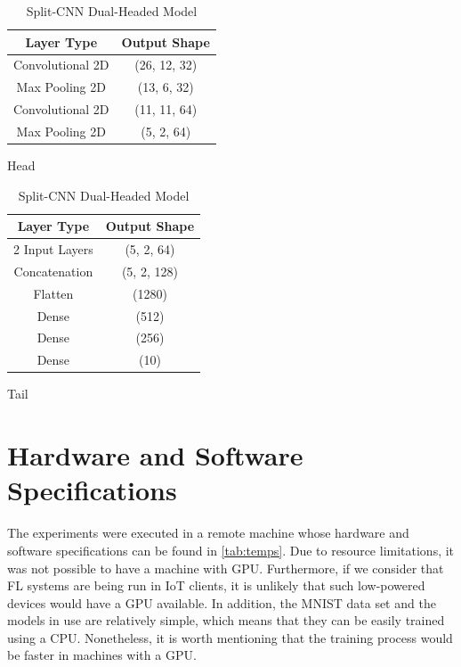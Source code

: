 \begin{table}[!h]
    \begin{subtable}[h]{0.49\textwidth}
        \centering
        \begin{tabular}{c|c}
            \hline \hline
            Layer Type       & Output Shape \\ \hline \hline
            Convolutional 2D & (26, 12, 32) \\ \hline
            Max Pooling 2D   & (13, 6, 32) \\ \hline
            Convolutional 2D & (11, 11, 64) \\ \hline
            Max Pooling 2D   & (5, 2, 64)   \\ \hline
        \end{tabular}
        \caption{Head}
    \end{subtable}
    \hfill
    \begin{subtable}[h]{0.49\textwidth}
        \centering
        \begin{tabular}{c|c}
            \hline\hline
            Layer Type     & Output Shape \\ \hline\hline
            2 Input Layers & (5, 2, 64)   \\ \hline
            Concatenation  & (5, 2, 128)  \\ \hline
            Flatten        & (1280)       \\ \hline
            Dense          & (512)        \\ \hline
            Dense          & (256)        \\ \hline
            Dense          & (10)         \\ \hline
        \end{tabular}
        \caption{Tail}
     \end{subtable}
     \caption{Split-CNN Dual-Headed Model}
     \label{tab:splitnn}
\end{table}

\section{Hardware and Software Specifications}

The experiments were executed in a remote machine whose hardware and software specifications can be found in \autoref{tab:temps}. Due to resource limitations, it was not possible to have a machine with GPU. Furthermore, if we consider that FL systems are being run in IoT clients, it is unlikely that such low-powered devices would have a GPU available. In addition, the MNIST data set and the models in use are relatively simple, which means that they can be easily trained using a CPU. Nonetheless, it is worth mentioning that the training process would be faster in machines with a GPU.


